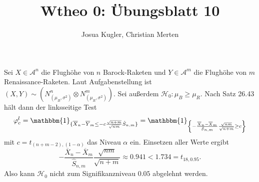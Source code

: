 \documentclass[uebung]{lecture}
\title{Wtheo 0: Übungsblatt 10}
\author{Josua Kugler, Christian Merten}
\begin{document}
\punkte[36]

\begin{aufgabe}
    Sei $X \in \mathscr{A}^{n}$ die Flughöhe von $n$ Barock-Raketen und $Y \in \mathscr{A}^{m}$ die Flughöhe
    von $m$ Renaissance-Raketen. Laut
    Aufgabenstellung ist $(X,Y) \sim (N_{(\mu_B, \sigma^2)}^{n} \otimes N_{(\mu_R, \sigma^2)}^{m})$.
    Sei außerdem $\mathscr{H}_0\colon \mu_B \ge \mu_R$. Nach Satz 26.43 hält dann
    der linksseitige Test
    \[
        \varphi_c^{l} = \mathbbm{1}_{ \{ \overline{X}_n - \overline{Y}_{m} \le -c \frac{\sqrt{n + m} }{\sqrt{nm} } \hat{S}_{n,m}\}} = \mathbbm{1}_{\left\{ - \frac{\overline{X}_n - \overline{X}_m}{\hat{S}_{n,m}} \frac{\sqrt{nm} }{\sqrt{n+m} } \ge c\right\} }
    \] mit $c = t_{(n+m-2),(1-\alpha)}$ das Niveau $\alpha$ ein.
    Einsetzen aller Werte ergibt
    \[
    - \frac{\overline{X}_n - \overline{X}_m}{\hat{S}_{n,m}} \frac{\sqrt{nm} }{\sqrt{n+m} }
    \approx 0.941 < 1.734 = t_{18,0.95}
    .\] Also kann $\mathscr{H}_0$ nicht zum Signifikanzniveau $0.05$ abgelehnt werden.
\end{aufgabe}
\end{document}
